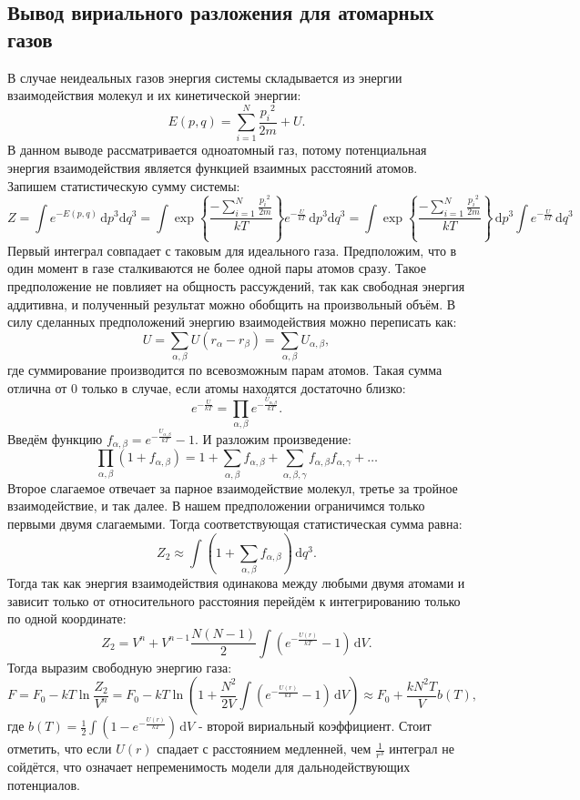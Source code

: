 \documentclass[12pt]{article}
\begin{document}
\subsection*{Вывод вириального разложения для атомарных газов} \label{app:1}
В случае неидеальных газов энергия системы складывается из энергии взаимодействия молекул и их кинетической энергии: 
\[
    E(p, q) = \sum_{i=1}^{N} \frac{{p_i}^2}{2m} + U.
\]
В данном выводе рассматривается одноатомный газ, потому потенциальная энергия взаимодействия является функцией взаимных расстояний атомов. 
Запишем статистическую сумму системы: 
\[
    Z = \int e^{-E(p, q)} \,\mathrm{d}p^3\mathrm{d}q^3 = 
    \int \exp {\left\{ \frac{-\sum_{i=1}^{N} \frac{{p_i}^2}{2m}}{kT} \right\} }  e^{-\frac{U}{kT}} \,\mathrm{d}p^3\mathrm{d}q^3 = 
    \int \exp {\left\{ \frac{-\sum_{i=1}^{N} \frac{{p_i}^2}{2m}}{kT} \right\} }  \,\mathrm{d}p^3 \int e^{-\frac{U}{kT}} \,\mathrm{d}q^3
\]
Первый интеграл совпадает с таковым для идеального газа. Предположим, что в один момент в газе сталкиваются не более одной пары атомов сразу.
Такое предположение не повлияет на общность рассуждений, так как свободная энергия аддитивна, и полученный 
результат можно обобщить на произвольный объём. В силу сделанных предположений энергию взаимодействия можно переписать как: 
\[
    U = \sum_{\alpha, \beta} U(r_\alpha - r_\beta) = \sum_{\alpha, \beta} U_{\alpha, \beta},   
\]
где суммирование производится по всевозможным парам атомов. 
Такая сумма отлична от 0 только в случае, если атомы находятся достаточно близко: 
\[
    e^{-\frac{U}{kT}} = \prod_{\alpha, \beta} e^{-\frac{U_{\alpha, \beta}}{kT}}.
\]
Введём функцию $f_{\alpha, \beta} = e^{-\frac{U_{\alpha, \beta}}{kT}} - 1$. И разложим произведение: 
\[
    \prod_{\alpha, \beta} \left( 1 + f_{\alpha, \beta} \right) = 1 + \sum_{\alpha, \beta} f_{\alpha, \beta} + \sum_{\alpha, \beta, \gamma} f_{\alpha, \beta} f_{\alpha, \gamma} + \dots   
\] 
Второе слагаемое отвечает за парное взаимодействие молекул, третье за тройное взаимодействие, и так далее. В нашем предположении 
ограничимся только первыми двумя слагаемыми. Тогда соответствующая статистическая сумма равна: 
\[
    Z_2 \approx \int \left( 1 + \sum_{\alpha, \beta} f_{\alpha, \beta} \right) \, \mathrm{d}q^3.
\]
Тогда так как энергия взаимодействия одинакова между любыми двумя атомами и зависит только от относительного расстояния перейдём к интегрированию только по одной координате: 
\[
    Z_2 = V^n + V^{n-1} \frac{N(N - 1)}{2} \int \left( e^{-\frac{U(r)}{kT}} - 1 \right) \,\mathrm{d}V.
\]
Тогда выразим свободную энергию газа: 
\[
    F = F_0 - kT \ln \frac{Z_2}{V^n} = F_0 - kT \ln \left( 1 + \frac{N^2}{2V} \int \left( e^{-\frac{U(r)}{kT}} - 1 \right) \,\mathrm{d}V \right) \approx 
    F_0 + \frac{kN^2T}{V} b(T),  
\]
где $b(T) = \frac{1}{2} \int \left( 1 - e^{-\frac{U(r)}{kT}} \right) \,\mathrm{d}V$ - второй вириальный коэффициент.
Стоит отметить, что если $U(r)$ спадает с расстоянием медленней, чем $\frac{1}{r^3}$ интеграл не сойдётся, что означает 
непременимость модели для дальнодействующих потенциалов. 
\end{document}

